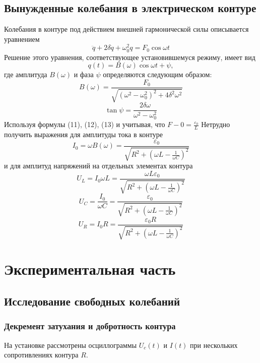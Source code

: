 \subsection{Вынужденные колебания в электрическом контуре} %
Колебания в контуре под действием внешней гармонической силы описывается уравнением
\begin{equation}
	\ddot{q}+2\delta\dot{q}+\omega_0^2 q= F_0\cos{\omega t}
\end{equation}
Решение этого уравнения, соответствующее установившемуся режиму, имеет вид
\begin{equation}
	q(t)=B(\omega)\cos{\omega t+\psi},
\end{equation}
где амплитуда $B(\omega)$ и фаза $\psi$ определяются следующим образом:
\begin{equation}
	B(\omega)=\frac{F_0}{\sqrt{(\omega^2-\omega_0^2)^2+4\delta^2\omega^2}}
\end{equation}
\begin{equation}
	\tan{\psi}=\frac{2\delta\omega}{\omega^2-\omega_0^2}
\end{equation}
	Используя формулы (11), (12), (13) и учитывая, что $F-0=\frac{\varepsilon_0}{L}$
Нетрудно получить выражения для амплитуды тока в контуре
\begin{equation}
	I_0=\omega B(\omega)=\frac{\varepsilon_0}{\sqrt{R^2+(\omega L-\frac{1}{\omega C})^2}}
\end{equation}
и для амплитуд напряжений на отдельных элементах контура
\begin{equation}
	U_L=I_0\omega L=\frac{\omega L\varepsilon_0}{\sqrt{R^2+(\omega L-\frac{1}{\omega C})^2}}
\end{equation}
\begin{equation}
	U_C=\frac{I_0}{\omega C}=\frac{\varepsilon_0}{\sqrt{R^2+(\omega L-\frac{1}{\omega C})^2}}
\end{equation}
\begin{equation}
	U_R=I_0R=\frac{\varepsilon_0R}{\sqrt{R^2+(\omega L-\frac{1}{\omega C})^2}}
\end{equation}

\newpage
\section{Экспериментальная часть}
\subsection{Исследование свободных колебаний}
\subsubsection{Декремент затухания и добротность контура}
На установке рассмотрены осциллограммы $U_c(t)$ и $I(t)$ при нескольких сопротивлениях контура $R$. 


